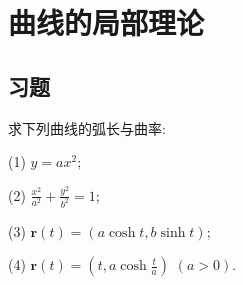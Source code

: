 \chapter{曲线的局部理论}
\section{习题}

\begin{tcolorbox}
	[breakable, colback = Emerald!10, colframe = cyan!40!black, title = 题2.1]
	求下列曲线的弧长与曲率:

(1) $y=ax^2$;

(2) $\frac{x^2}{a^2}+\frac{y^2}{b^2}=1$;

(3) $\boldsymbol{r}(t) = (a \cosh t, b \sinh t)$;

(4) $\boldsymbol{r}(t) = (t, a \cosh \frac{t}{a})$ $(a>0)$.
\end{tcolorbox}

